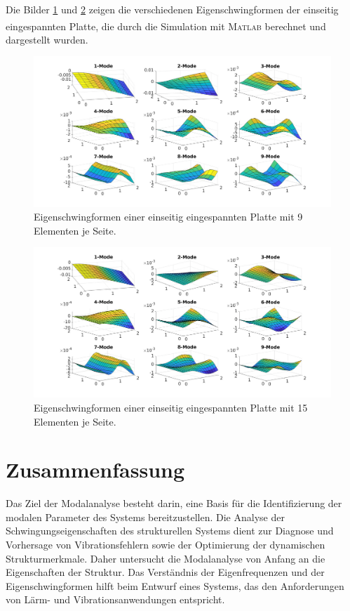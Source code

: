 \documentclass[a4paper,10pt,twoside]{article}
\numberwithin{equation}{section} %
\numberwithin{figure}{section}   %
\numberwithin{table}{section}    %
\newcommand{\Matlab}{\textsc{Matlab}\textsuperscript{\textregistered} }
\begin{document}
	Die Bilder \ref{fig:platten-RB-9} und \ref{fig:platten-RB-15} zeigen die verschiedenen Eigenschwingformen der einseitig eingespannten Platte, die durch die Simulation mit \Matlab berechnet und dargestellt wurden.
	\begin{figure}[H]
		\centering
		\includegraphics[width=1.0\linewidth]{Platten_RB_9}
		\caption{Eigenschwingformen einer einseitig eingespannten Platte mit 9 Elementen je Seite.}
		\label{fig:platten-RB-9}
	\end{figure}	
	\begin{figure}[H]
		\centering
		\includegraphics[width=1.0\linewidth]{Platten_RB_15}
		\caption{Eigenschwingformen einer einseitig eingespannten Platte mit 15 Elementen je Seite.}
		\label{fig:platten-RB-15}
	\end{figure}
	
	
	\clearpage
	\pagestyle{fancy}	
	\section{Zusammenfassung}
	Das Ziel der Modalanalyse besteht darin, eine Basis für die Identifizierung der modalen Parameter des Systems bereitzustellen. Die Analyse der Schwingungseigenschaften des strukturellen Systems dient zur Diagnose und Vorhersage von Vibrationsfehlern sowie der Optimierung der dynamischen Strukturmerkmale. Daher untersucht die Modalanalyse von Anfang an die Eigenschaften der Struktur. Das Verständnis der Eigenfrequenzen und der Eigenschwingformen hilft beim Entwurf eines Systems, das den Anforderungen von Lärm- und Vibrationsanwendungen entspricht.\\
	
\end{document}
